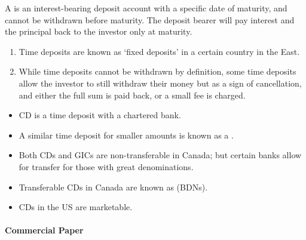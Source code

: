 \documentclass[notoc,notitlepage]{tufte-book}
\begin{document}
\begin{defn}\label{defn:time_deposit}
  A  is an interest-bearing deposit account
  with a specific date of maturity, and cannot be withdrawn
  before maturity.
  The deposit bearer will pay interest and the principal
  back to the investor only at maturity.
\end{defn}

\begin{remark}
  \begin{enumerate}
    \item Time deposits are known as `fixed deposits' in a certain country in
      the East.
    \item While time deposits cannot be withdrawn by definition,
      some time deposits allow the investor to still withdraw their money
      but as a sign of cancellation,
      and either the full sum is paid back, or a small fee is charged.
  \end{enumerate}
\end{remark}

\begin{itemize}
  \item CD is a time deposit with a chartered bank.
  \item A similar time deposit for smaller amounts is known as a
    .
  \item Both CDs and GICs are non-transferable in Canada;
    but certain banks allow for transfer for those with great denominations.
  \item Transferable CDs in Canada are known as 
    (BDNs).
  \item CDs in the US are marketable.
\end{itemize}

\paragraph{Commercial Paper}
\end{document}

